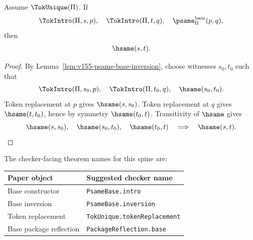 \begin{theorem}
\label{thm:v155-base-package-reflection}
Assume \(\TokUnique(\Pi)\). If
\[
  \TokIntro(\Pi,s,p),\quad \TokIntro(\Pi,t,q),\quad \psame_{\Pi}^{\mathrm{base}}(p,q),
\]
then
\[
  \hsame(s,t).
\]
\end{theorem}

\begin{proof}
By Lemma~\ref{lem:v155-psame-base-inversion}, choose witnesses \(s_0,t_0\) such that
\[
  \TokIntro(\Pi,s_0,p),\quad \TokIntro(\Pi,t_0,q),\quad \hsame(s_0,t_0).
\]
Token replacement at \(p\) gives \(\hsame(s,s_0)\). Token replacement at \(q\) gives \(\hsame(t,t_0)\), hence by symmetry \(\hsame(t_0,t)\). Transitivity of \(\hsame\) gives
\[
  \hsame(s,s_0),\quad \hsame(s_0,t_0),\quad \hsame(t_0,t)
  \quad\Longrightarrow\quad \hsame(s,t).
\]
\end{proof}

\begin{protocol}
\label{prot:v155-public-base-reflection-names}
The checker-facing theorem names for this spine are:
\begin{center}
\begin{tabular}{ll}
\toprule
\textbf{Paper object} & \textbf{Suggested checker name}\\
\midrule
Base constructor & \texttt{PsameBase.intro}\\
Base inversion & \texttt{PsameBase.inversion}\\
Token replacement & \texttt{TokUnique.tokenReplacement}\\
Base package reflection & \texttt{PackageReflection.base}\\
\bottomrule
\end{tabular}
\end{center}
\end{protocol}
